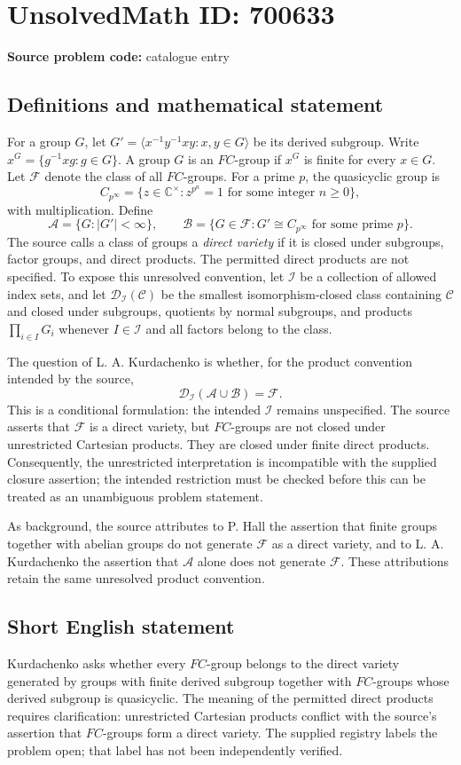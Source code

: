 \documentclass[11pt]{article}
\newcommand{\C}{\mathbb{C}}
\begin{document}
\section*{UnsolvedMath ID: 700633}
\textbf{Source problem code:} catalogue entry
\subsection{Definitions and mathematical statement}
For a group \(G\), let \(G'=\langle x^{-1}y^{-1}xy:x,y\in G\rangle\) be its derived subgroup. Write \(x^G=\{g^{-1}xg:g\in G\}\). A group \(G\) is an \(FC\)-group if \(x^G\) is finite for every \(x\in G\). Let \(\mathcal F\) denote the class of all \(FC\)-groups. For a prime \(p\), the quasicyclic group is
\[
C_{p^\infty}=\{z\in\C^\times:z^{p^n}=1\text{ for some integer }n\geq 0\},
\]
with multiplication. Define
\[
\mathcal A=\{G:|G'|<\infty\},\qquad
\mathcal B=\{G\in\mathcal F:G'\cong C_{p^\infty}\text{ for some prime }p\}.
\]
The source calls a class of groups a \emph{direct variety} if it is closed under subgroups, factor groups, and direct products. The permitted direct products are not specified. To expose this unresolved convention, let \(\mathscr I\) be a collection of allowed index sets, and let \(\mathcal D_{\mathscr I}(\mathcal C)\) be the smallest isomorphism-closed class containing \(\mathcal C\) and closed under subgroups, quotients by normal subgroups, and products \(\prod_{i\in I}G_i\) whenever \(I\in\mathscr I\) and all factors belong to the class.

The question of L. A. Kurdachenko is whether, for the product convention intended by the source,
\[
\mathcal D_{\mathscr I}(\mathcal A\cup\mathcal B)=\mathcal F.
\]
This is a conditional formulation: the intended \(\mathscr I\) remains unspecified. The source asserts that \(\mathcal F\) is a direct variety, but \(FC\)-groups are not closed under unrestricted Cartesian products. They are closed under finite direct products. Consequently, the unrestricted interpretation is incompatible with the supplied closure assertion; the intended restriction must be checked before this can be treated as an unambiguous problem statement.

As background, the source attributes to P. Hall the assertion that finite groups together with abelian groups do not generate \(\mathcal F\) as a direct variety, and to L. A. Kurdachenko the assertion that \(\mathcal A\) alone does not generate \(\mathcal F\). These attributions retain the same unresolved product convention.
\subsection{Short English statement}
Kurdachenko asks whether every \(FC\)-group belongs to the direct variety generated by groups with finite derived subgroup together with \(FC\)-groups whose derived subgroup is quasicyclic. The meaning of the permitted direct products requires clarification: unrestricted Cartesian products conflict with the source's assertion that \(FC\)-groups form a direct variety. The supplied registry labels the problem open; that label has not been independently verified.
\end{document}
